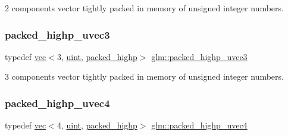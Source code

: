 2 components vector tightly packed in memory of unsigned integer numbers. 

\mbox{\label{group__gtc__type__aligned_ga607425d3ca2ad292b115d09aef19e372}} 
\subsubsection{\texorpdfstring{packed\+\_\+highp\+\_\+uvec3}{packed\_highp\_uvec3}}
{\footnotesize\ttfamily typedef \mbox{\hyperlink{structglm_1_1vec}{vec}}$<$3, \mbox{\hyperlink{group__core__precision_ga4fd29415871152bfb5abd588334147c8}{uint}}, \mbox{\hyperlink{namespaceglm_a36ed105b07c7746804d7fdc7cc90ff25a8e8791ee77fe079b1291f710d88031bf}{packed\+\_\+highp}}$>$ \mbox{\hyperlink{group__gtc__type__aligned_ga607425d3ca2ad292b115d09aef19e372}{glm\+::packed\+\_\+highp\+\_\+uvec3}}}



3 components vector tightly packed in memory of unsigned integer numbers. 

\mbox{\label{group__gtc__type__aligned_ga769bab317264c023f8ee77897e4b5894}} 
\subsubsection{\texorpdfstring{packed\+\_\+highp\+\_\+uvec4}{packed\_highp\_uvec4}}
{\footnotesize\ttfamily typedef \mbox{\hyperlink{structglm_1_1vec}{vec}}$<$4, \mbox{\hyperlink{group__core__precision_ga4fd29415871152bfb5abd588334147c8}{uint}}, \mbox{\hyperlink{namespaceglm_a36ed105b07c7746804d7fdc7cc90ff25a8e8791ee77fe079b1291f710d88031bf}{packed\+\_\+highp}}$>$ \mbox{\hyperlink{group__gtc__type__aligned_ga769bab317264c023f8ee77897e4b5894}{glm\+::packed\+\_\+highp\+\_\+uvec4}}}



